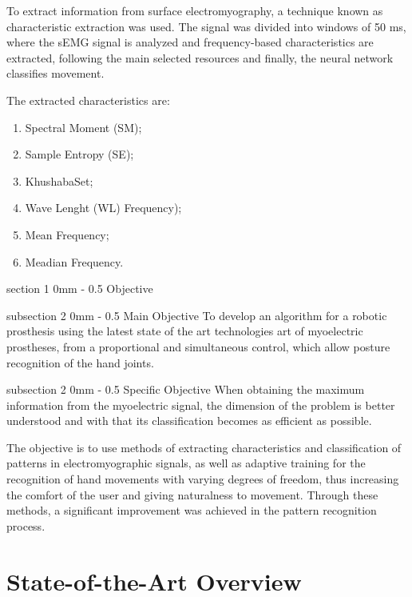\documentclass[a4paper, 12pt]{ppgeb}
\makeatletter
\renewcommand{\section}{\@startsection
{section}
{1}
{0mm}
{-\baselineskip}
{0.5\baselineskip}
{\large\bfseries\scshape}}
\renewcommand{\subsection}{\@startsection
{subsection}
{2}
{0mm}
{-\baselineskip}
{0.5\baselineskip}
{\bf\sffamily}}
\makeatother
\begin{document}
To extract information from surface electromyography, a technique known as characteristic extraction was used. The signal was divided into windows of 50 ms, where the sEMG signal is analyzed and frequency-based characteristics are extracted, following the main selected resources and finally, the neural network classifies movement.

The extracted characteristics are:
\begin{enumerate}
\item Spectral Moment (\ac{SM});
\item Sample Entropy (\ac{SE});
\item KhushabaSet;
\item Wave Lenght (WL) Frequency);
\item Mean Frequency;
\item Meadian Frequency.
\end{enumerate}

\section{Objective}

\subsection{Main Objective}
To develop an algorithm for a robotic prosthesis using the latest state of the art technologies art of myoelectric prostheses, from a proportional and simultaneous control, which allow posture recognition of the hand joints.

\subsection{Specific Objective}
When obtaining the maximum information from the myoelectric signal, the dimension of the problem is better understood and with that its classification becomes as efficient as possible.

The objective is to use methods of extracting characteristics and classification of patterns in electromyographic signals,  as well as adaptive training for the recognition of hand movements with varying degrees of freedom, thus increasing the comfort of the user and giving naturalness to movement.  Through these methods, a significant improvement was achieved in the pattern recognition process.

\chapter{State-of-the-Art Overview}\label{chap:StateOfArt}
\end{document}
